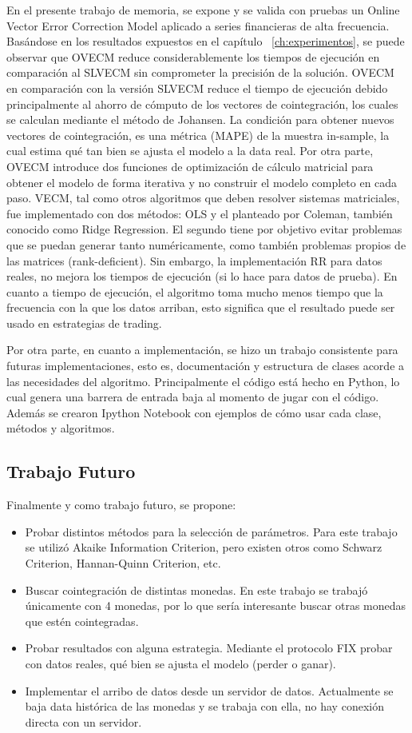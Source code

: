 En el presente trabajo de memoria, se expone y se valida con pruebas un  Online
Vector Error Correction Model aplicado a series financieras de alta frecuencia.
Basándose en los resultados expuestos en el capítulo ~\ref{ch:experimentos}, se
puede observar que OVECM reduce considerablemente los tiempos de ejecución en
comparación al SLVECM sin comprometer la precisión de la solución. OVECM en
comparación con la versión SLVECM reduce el tiempo de ejecución debido
principalmente al ahorro de cómputo de los vectores de cointegración, los
cuales se calculan mediante el método de Johansen. La condición para obtener
nuevos vectores de cointegración, es una métrica (MAPE) de la muestra
in-sample, la cual estima qué tan bien se ajusta el modelo a la data real. Por
otra parte, OVECM introduce dos funciones de optimización de cálculo matricial
para obtener el modelo de forma iterativa y no construir el modelo completo en
cada paso.  VECM, tal como otros algoritmos que deben resolver sistemas
matriciales, fue implementado con dos métodos: OLS y el planteado por Coleman,
también conocido como Ridge Regression. El segundo tiene por objetivo evitar
problemas que se puedan generar tanto numéricamente, como también problemas
propios de las matrices (rank-deficient). Sin embargo, la implementación RR
para datos reales, no mejora los tiempos de ejecución (si lo hace para datos de
prueba). En cuanto a tiempo de ejecución, el algoritmo toma mucho menos tiempo
que la frecuencia con la que los datos arriban, esto significa que el resultado
puede ser usado en estrategias de trading.

Por otra parte, en cuanto a implementación, se hizo un trabajo consistente para
futuras implementaciones, esto es, documentación y estructura de clases acorde
a las necesidades del algoritmo. Principalmente el código está hecho en Python,
lo cual genera una barrera de entrada baja al momento de jugar con el código.
Además se crearon Ipython Notebook con ejemplos de cómo usar cada clase,
métodos y algoritmos.

\newpage
\subsection{Trabajo Futuro}
Finalmente y como trabajo futuro, se propone:
\begin{itemize}
 \item Probar distintos métodos para la selección de parámetros. Para este
trabajo se utilizó Akaike Information Criterion, pero existen otros como
Schwarz Criterion, Hannan-Quinn Criterion, etc.
 \item Buscar cointegración de distintas monedas. En este trabajo se trabajó
únicamente con 4 monedas, por lo que sería interesante buscar otras monedas que
estén cointegradas.
 \item Probar resultados con alguna estrategia. Mediante el protocolo FIX
probar con datos reales, qué bien se ajusta el modelo (perder o ganar).
 \item Implementar el arribo de datos desde un servidor de datos. Actualmente
se baja data histórica de las monedas y se trabaja con ella, no hay conexión
directa con un servidor.
\end{itemize}

